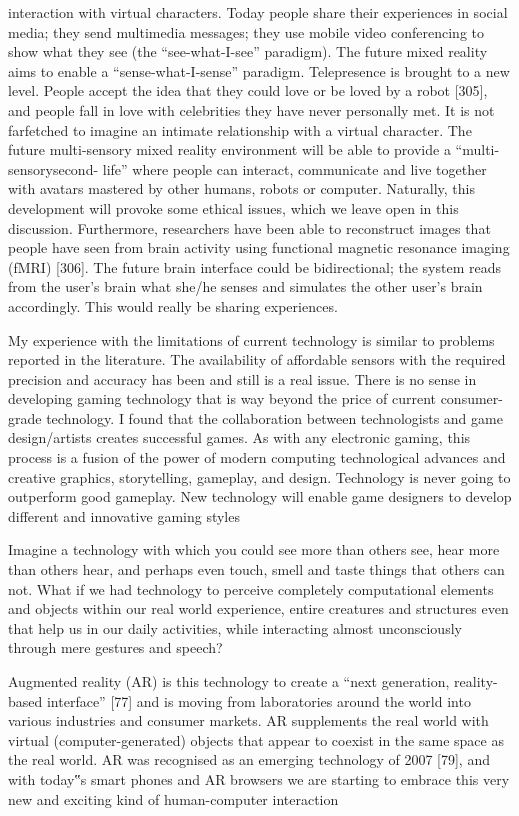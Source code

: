 interaction with virtual characters. Today people share their experiences in social media; they send multimedia messages; they use mobile video conferencing to show what they see (the “see-what-I-see” paradigm). The future mixed reality aims to enable a “sense-what-I-sense” paradigm. Telepresence is brought to a new level. People accept the idea that they could love or be loved by a robot [305], and people fall in love with celebrities they have never personally met. It is not farfetched to imagine an intimate relationship with a virtual character. The future multi-sensory mixed reality environment will be able to provide a “multi-sensorysecond- life” where people can interact, communicate and live together with avatars mastered by other humans, robots or computer. Naturally, this development will provoke some ethical issues, which we leave open in this discussion. Furthermore, researchers have been able to reconstruct images that people have seen from brain activity using functional magnetic resonance imaging (fMRI) [306]. The future brain interface could be bidirectional; the system reads from the user’s brain what she/he senses and simulates the other user’s brain accordingly. This would really be sharing experiences.


My experience with the limitations of current technology is similar to problems reported in the literature. The availability of affordable sensors with the required precision and accuracy has been and still is a real issue. There is no sense in developing gaming technology that is way beyond the price of current consumer-grade technology. I found that the collaboration between technologists and game design/artists creates successful games. As with any electronic gaming, this process is a fusion of the power of modern computing technological advances and creative graphics, storytelling, gameplay, and design. Technology is never going to outperform good gameplay. New technology will enable game designers to develop different and innovative gaming styles


Imagine a technology with which you could see more than
others see, hear more than others hear, and perhaps even
touch, smell and taste things that others can not. What if we
had technology to perceive completely computational elements
and objects within our real world experience, entire
creatures and structures even that help us in our daily activities,
while interacting almost unconsciously through mere
gestures and speech?

Augmented reality (AR) is this technology to create a
“next generation, reality-based interface” [77] and is moving
from laboratories around the world into various industries
and consumer markets. AR supplements the real world with
virtual (computer-generated) objects that appear to coexist in
the same space as the real world. AR was recognised as an
emerging technology of 2007 [79], and with today‟s smart
phones and AR browsers we are starting to embrace this very
new and exciting kind of human-computer interaction


